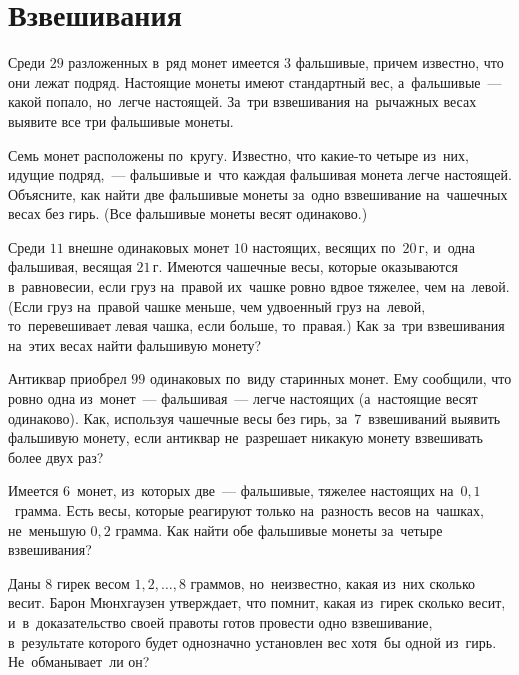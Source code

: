 
\section*{Взвешивания}


\begin{problems}

\item
Среди $29$ разложенных в~ряд монет имеется $3$ фальшивые, причем известно, что
они лежат подряд.
Настоящие монеты имеют стандартный вес, а~фальшивые~--- какой попало, но~легче
настоящей.
За~три взвешивания на~рычажных весах выявите все три фальшивые монеты.

\item
Семь монет расположены по~кругу.
Известно, что какие-то четыре из~них, идущие подряд,~--- фальшивые и~что каждая
фальшивая монета легче настоящей.
Объясните, как найти две фальшивые монеты за~одно взвешивание на~чашечных весах
без гирь.
(Все фальшивые монеты весят одинаково.)

\item
Среди $11$ внешне одинаковых монет $10$ настоящих, весящих по~$20\,\text{г}$,
и~одна фальшивая, весящая $21\,\text{г}$.
Имеются чашечные весы, которые оказываются в~равновесии, если груз на~правой
их~чашке ровно вдвое тяжелее, чем на~левой.
(Если груз на~правой чашке меньше, чем удвоенный груз на~левой, то~перевешивает
левая чашка, если больше, то~правая.)
Как за~три взвешивания на~этих весах найти фальшивую монету?

\item
Антиквар приобрел $99$ одинаковых по~виду старинных монет.
Ему сообщили, что ровно одна из~монет~--- фальшивая~--- легче настоящих
(а~настоящие весят одинаково).
Как, используя чашечные весы без гирь, за~$7$~взвешиваний выявить фальшивую
монету, если антиквар не~разрешает никакую монету взвешивать более двух раз?

\item
Имеется $6$~монет, из~которых две~--- фальшивые, тяжелее настоящих
на~$0{,}1$~грамма.
Есть весы, которые реагируют только на~разность весов на~чашках, не~меньшую
$0{,}2$ грамма.
Как найти обе фальшивые монеты за~четыре взвешивания?

\item
Даны $8$ гирек весом $1, 2, \ldots, 8$ граммов, но~неизвестно, какая из~них
сколько весит.
Барон Мюнхгаузен утверждает, что помнит, какая из~гирек сколько весит,
и~в~доказательство своей правоты готов провести одно взвешивание, в~результате
которого будет однозначно установлен вес хотя~бы одной из~гирь.
Не~обманывает~ли он?


\end{problems}
